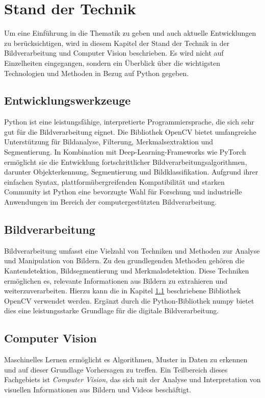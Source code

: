 \documentclass[journal,twoside,web]{ieeecolor}
\begin{document}
\section{Stand der Technik}
\label{sec:state_of_the_art}
Um eine Einführung in die Thematik zu geben und auch aktuelle Entwicklungen zu berücksichtigen, wird in diesem Kapitel der Stand der Technik in der Bildverarbeitung und Computer Vision beschrieben. Es wird nicht auf Einzelheiten eingegangen, sondern ein Überblick über die wichtigsten Technologien und Methoden in Bezug auf Python gegeben.

\subsection{Entwicklungswerkzeuge}
\label{sec:tools}
Python ist eine leistungsfähige, interpretierte Programmiersprache, die sich sehr gut für die Bildverarbeitung eignet. Die Bibliothek OpenCV bietet umfangreiche Unterstützung für Bildanalyse, Filterung, Merkmalsextraktion und Segmentierung. In Kombination mit Deep-Learning-Frameworks wie PyTorch ermöglicht sie die Entwicklung fortschrittlicher Bildverarbeitungsalgorithmen, darunter Objekterkennung, Segmentierung und Bildklassifikation. Aufgrund ihrer einfachen Syntax, plattformübergreifenden Kompatibilität und starken Community ist Python eine bevorzugte Wahl für Forschung und industrielle Anwendungen im Bereich der computergestützten Bildverarbeitung.

\subsection{Bildverarbeitung}
\label{sec:image_processing}
Bildverarbeitung umfasst eine Vielzahl von Techniken und Methoden zur Analyse und Manipulation von Bildern. Zu den grundlegenden Methoden gehören die Kantendetektion, Bildsegmentierung und Merkmalsdetektion. Diese Techniken ermöglichen es, relevante Informationen aus Bildern zu extrahieren und weiterzuverarbeiten. Hierzu kann die in Kapitel \ref{sec:tools} beschriebene Bibliothek OpenCV verwendet werden. Ergänzt durch die Python-Bibliothek numpy bietet dies eine leistungsstarke Grundlage für die digitale Bildverarbeitung.

\subsection{Computer Vision}
\label{sec:computer_vision}
Maschinelles Lernen ermöglicht es Algorithmen, Muster in Daten zu erkennen und auf dieser Grundlage Vorhersagen zu treffen. Ein Teilbereich dieses Fachgebiets ist \textit{Computer Vision}, das sich mit der Analyse und Interpretation von visuellen Informationen aus Bildern und Videos beschäftigt.
\end{document}
